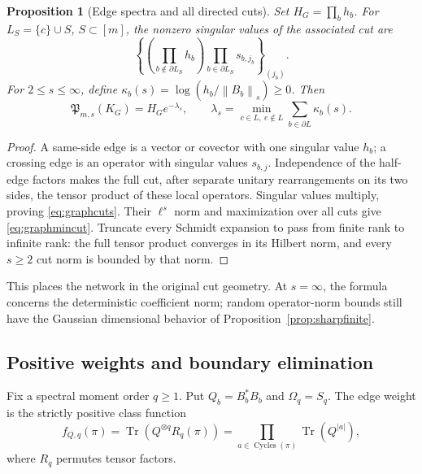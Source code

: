 \documentclass[11pt,a4paper]{amsart}
\numberwithin{equation}{section}
\newtheorem{proposition}[theorem]{Proposition}
\theoremstyle{definition}
\theoremstyle{remark}
\newcommand{\Prof}{\mathfrak P}
\DeclareMathOperator{\Tr}{Tr}
\newcommand{\norm}[1]{\left\lVert#1\right\rVert}
\begin{document}
\begin{proposition}[Edge spectra and all directed cuts]\label{prop:graphcuts}
Set $H_G=\prod_bh_b$. For $L_S=\{c\}\cup S$, $S\subset[m]$, the nonzero singular values of the associated cut are
\begin{equation}\label{eq:graphcuts}
 \left\{\left(\prod_{b\notin\partial L_S}h_b\right)
                  \prod_{b\in\partial L_S}s_{b,j_b}\right\}_{(j_b)}.
\end{equation}
For $2\le s\le\infty$, define $\kappa_b(s)=\log(h_b/\norm{B_b}_s)\ge0$. Then
\begin{equation}\label{eq:graphmincut}
 \Prof_{m,s}(K_G)=H_Ge^{-\lambda_s},\qquad
 \lambda_s=\min_{c\in L,\ e\notin L}\sum_{b\in\partial L}\kappa_b(s).
\end{equation}
\end{proposition}
\begin{proof}
A same-side edge is a vector or covector with one singular value $h_b$; a crossing edge is an operator with singular values $s_{b,j}$. Independence of the half-edge factors makes the full cut, after separate unitary rearrangements on its two sides, the tensor product of these local operators. Singular values multiply, proving \eqref{eq:graphcuts}. Their $\ell^s$ norm and maximization over all cuts give \eqref{eq:graphmincut}. Truncate every Schmidt expansion to pass from finite rank to infinite rank: the full tensor product converges in its Hilbert norm, and every $s\ge2$ cut norm is bounded by that norm.
\end{proof}
This places the network in the original cut geometry. At $s=\infty$, the formula concerns the deterministic coefficient norm; random operator-norm bounds still have the Gaussian dimensional behavior of Proposition~\ref{prop:sharpfinite}.

\subsection{Positive weights and boundary elimination}
Fix a spectral moment order $q\ge1$. Put $Q_b=B_b^*B_b$ and $\Omega_q=S_q$. The edge weight is the strictly positive class function
\begin{equation}\label{eq:physical_edge_weight}
 f_{Q,q}(\pi)=\Tr(Q^{\otimes q}R_q(\pi))
 =\prod_{a\in\operatorname{Cycles}(\pi)}\Tr(Q^{|a|}),
\end{equation}
where $R_q$ permutes tensor factors.
\end{document}
